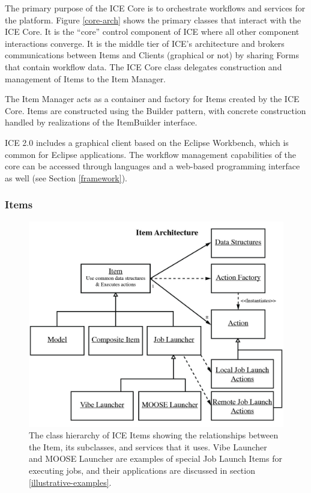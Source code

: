 The primary purpose of the ICE Core is to orchestrate workflows and services for the platform. Figure \ref{core-arch} shows the primary classes that interact with the ICE Core. It is the ``core'' control component of ICE where all other component interactions converge. It is the middle tier of ICE's architecture and brokers communications between Items and Clients (graphical or not) by sharing Forms that contain workflow data. The ICE Core class delegates construction and management of Items to the Item Manager. 

The Item Manager acts as a container and factory for Items created by the ICE Core. Items are constructed using the Builder pattern, with concrete construction handled by realizations of the ItemBuilder interface. 

ICE 2.0 includes a graphical client based on the Eclipse Workbench, which is common for Eclipse applications. The workflow management capabilities of the core can be accessed through languages and a web-based programming interface as well (see Section \ref{framework}).

\subsubsection{Items}
\label{item}
\label{item-states}

\begin{figure}[htbp]
\centering
\includegraphics[width=\textwidth]{src/images/ICE-arch-3.jpg}
\caption{The class hierarchy of ICE Items showing the relationships between the Item, its subclasses, and services that it uses. Vibe Launcher and MOOSE Launcher are examples of special Job Launch Items for executing jobs, and their applications are discussed in section \ref{illustrative-examples}.}
\label{item-arch}
\end{figure}

